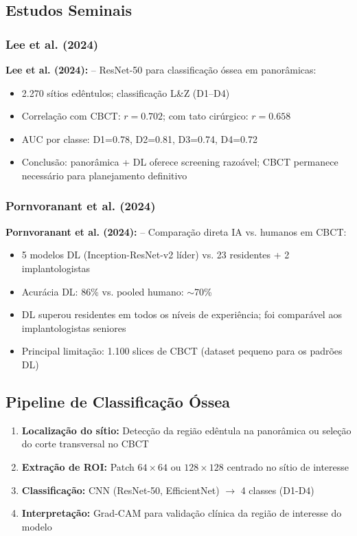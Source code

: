 \subsection{Estudos Seminais}

\subsubsection{Lee et al. (2024)}

\textbf{Lee et al. (2024):}  -- ResNet-50 para classificação
óssea em panorâmicas:
\begin{itemize}
  \item 2.270 sítios edêntulos; classificação L\&Z (D1--D4)
  \item Correlação com CBCT: $r = 0.702$; com tato cirúrgico: $r = 0.658$
  \item AUC por classe: D1=0.78, D2=0.81, D3=0.74, D4=0.72
  \item Conclusão: panorâmica + DL oferece screening razoável; CBCT permanece
        necessário para planejamento definitivo
\end{itemize}

\subsubsection{Pornvoranant et al. (2024)}

\textbf{Pornvoranant et al. (2024):}  -- Comparação direta
IA vs. humanos em CBCT:
\begin{itemize}
  \item 5 modelos DL (Inception-ResNet-v2 líder) vs. 23 residentes + 2 implantologistas
  \item Acurácia DL: 86\% vs. pooled humano: $\sim$70\%
  \item DL superou residentes em todos os níveis de experiência; foi comparável
        aos implantologistas seniores
  \item Principal limitação: 1.100 slices de CBCT (dataset pequeno para os padrões DL)
\end{itemize}

\subsection{Pipeline de Classificação Óssea}

\begin{enumerate}
  \item \textbf{Localização do sítio:} Detecção da região edêntula na panorâmica ou
        seleção do corte transversal no CBCT
  \item \textbf{Extração de ROI:} Patch $64\times64$ ou $128\times128$ centrado
        no sítio de interesse
  \item \textbf{Classificação:} CNN (ResNet-50, EfficientNet) $\to$ 4 classes (D1-D4)
  \item \textbf{Interpretação:} Grad-CAM para validação clínica da região de
        interesse do modelo
\end{enumerate}

